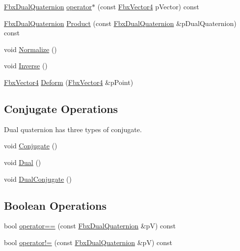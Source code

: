\begin{DoxyCompactItemize}
\item 
\hyperlink{class_fbx_dual_quaternion}{Fbx\+Dual\+Quaternion} \hyperlink{class_fbx_dual_quaternion_aa654ff2e0a7e803ece4ef9267af05dc5}{operator$\ast$} (const \hyperlink{class_fbx_vector4}{Fbx\+Vector4} p\+Vector) const
\item 
\hyperlink{class_fbx_dual_quaternion}{Fbx\+Dual\+Quaternion} \hyperlink{class_fbx_dual_quaternion_a76ce93e64d63ea797fba4db42670de82}{Product} (const \hyperlink{class_fbx_dual_quaternion}{Fbx\+Dual\+Quaternion} \&p\+Dual\+Quaternion) const
\item 
void \hyperlink{class_fbx_dual_quaternion_a542fd8a7cfd918eb3c8213c30c28269a}{Normalize} ()
\item 
void \hyperlink{class_fbx_dual_quaternion_ab27c0b36e0c9387448f7b00af47428dd}{Inverse} ()
\item 
\hyperlink{class_fbx_vector4}{Fbx\+Vector4} \hyperlink{class_fbx_dual_quaternion_a9a3380796ebd7bdcdc0c3f7363181b0f}{Deform} (\hyperlink{class_fbx_vector4}{Fbx\+Vector4} \&p\+Point)
\end{DoxyCompactItemize}
\subsection*{Conjugate Operations}
\label{_amgrp955d608e1ce67d6afea90e8be242f06c}%
Dual quaternion has three types of conjugate. \begin{DoxyCompactItemize}
\item 
void \hyperlink{class_fbx_dual_quaternion_a4b868a1951c6c4bdf81d30acbc5dec87}{Conjugate} ()
\item 
void \hyperlink{class_fbx_dual_quaternion_ac932bf84d0cf5a6e397de55fdde914a6}{Dual} ()
\item 
void \hyperlink{class_fbx_dual_quaternion_ad371018282581c2120cd5e0a9dfe456b}{Dual\+Conjugate} ()
\end{DoxyCompactItemize}
\subsection*{Boolean Operations}
\begin{DoxyCompactItemize}
\item 
bool \hyperlink{class_fbx_dual_quaternion_aeaf9715f0816c453828ebef237318151}{operator==} (const \hyperlink{class_fbx_dual_quaternion}{Fbx\+Dual\+Quaternion} \&pV) const
\item 
bool \hyperlink{class_fbx_dual_quaternion_ad2de307a8df279d3c2beb098861ff573}{operator!=} (const \hyperlink{class_fbx_dual_quaternion}{Fbx\+Dual\+Quaternion} \&pV) const
\end{DoxyCompactItemize}


